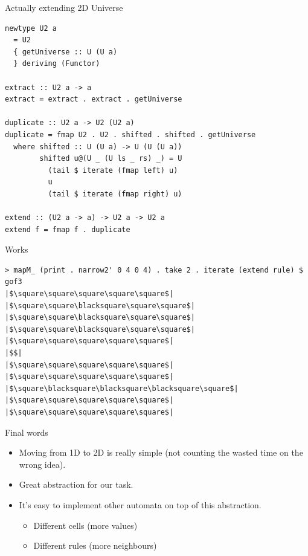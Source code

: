 \documentclass[presentation,aspectratio=169,smaller]{beamer}
\begin{document}
\begin{frame}[label={sec:org5775ff0},fragile]{Actually extending 2D Universe}
 \begin{verbatim}
newtype U2 a
  = U2
  { getUniverse :: U (U a)
  } deriving (Functor)

extract :: U2 a -> a
extract = extract . extract . getUniverse

duplicate :: U2 a -> U2 (U2 a)
duplicate = fmap U2 . U2 . shifted . shifted . getUniverse
  where shifted :: U (U a) -> U (U (U a))
        shifted u@(U _ (U ls _ rs) _) = U
          (tail $ iterate (fmap left) u)
          u
          (tail $ iterate (fmap right) u)

extend :: (U2 a -> a) -> U2 a -> U2 a
extend f = fmap f . duplicate
\end{verbatim}
\end{frame}

\begin{frame}[label={sec:org3ed5d2d},fragile]{Works}
 \begin{verbatim}
> mapM_ (print . narrow2' 0 4 0 4) . take 2 . iterate (extend rule) $ gof3
|$\square\square\square\square\square$|
|$\square\square\blacksquare\square\square$|
|$\square\square\blacksquare\square\square$|
|$\square\square\blacksquare\square\square$|
|$\square\square\square\square\square$|
|$$|
|$\square\square\square\square\square$|
|$\square\square\square\square\square$|
|$\square\blacksquare\blacksquare\blacksquare\square$|
|$\square\square\square\square\square$|
|$\square\square\square\square\square$|
\end{verbatim}
\end{frame}

\begin{frame}[label={sec:org556ebaf}]{Final words}
\begin{itemize}
\item <1-> Moving from 1D to 2D is really simple (not counting the wasted time on the
wrong idea).
\item <2-> Great abstraction for our task.
\item <3-> It's easy to implement other automata on top of this abstraction.
\begin{itemize}
\item Different cells (more values)
\item Different rules (more neighbours)
\end{itemize}
\end{itemize}
\end{frame}
\end{document}
